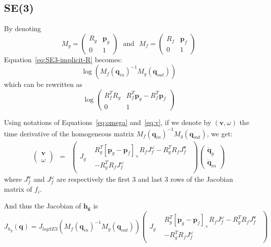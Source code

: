 \documentclass {article}
\newcommand\conf{\mathbf{q}}
\begin{document}
\subsection {SE(3)}

By denoting
$$
M_g=\left(\begin{array}{cc}R_g &\mathbf{p}_g\\
0 & 1 \end{array}\right)\ \ \  \mbox{and} \ \ \ M_{f}=\left(\begin{array}{cc}R_{f} &\mathbf{p}_{f}\\
0 & 1 \end{array}\right)
$$
Equation~\eqref{eq:SE3-implicit-R} becomes:
\begin{equation}\label{eq:g-SE3-implicit-R}
\log (M_{f}(\conf_{in})^{-1} M_g(\conf_{out}))
\end{equation}
which can be rewritten as
$$
\log \left(\begin{array}{cc}
R_{f}^T R_g & R_{f}^T\mathbf{p}_g - R_{f}^T\mathbf{p}_{f}\\
0 & 1
\end{array}\right)
$$

Using notations of Equations~\eqref{eq:omega} and~\eqref{eq:v},
if we denote by $(\mathbf{v}, \omega)$ the time derivative of the homogeneous matrix $M_{f}(\conf_{in})^{-1} M_g (\conf_{out})$, we get:
\begin{eqnarray*}
\left(\begin{array}{c}\mathbf{v}\\\omega\end{array}\right) &=&
\left(\begin{array}{cc}J_g & \begin{array}{c}R_g^T [\mathbf{p}_g - \mathbf{p}_{f}]_{\times} R_{f}J_{f}^{\omega} - R_g^T R_{f}J_{f}^{\mathbf{v}}\\
-R_g^TR_{f} J_{f}^{\omega}\end{array}\end{array}\right)
\left(\begin{array}{c}\dot{\conf}_g \\\dot{\conf}_{in}\end{array}\right)
\end{eqnarray*}
where $J_{f}^{\mathbf{v}}$ and $J_{f}^{\omega}$ are respectively the first 3 and last
3 rows of the Jacobian matrix of $f_i$.

And thus the Jacobian of $\mathbf{h_g}$ is
$$
J_{h_g} (\conf) = J_{logSE3} (M_{f}(\conf_{in})^{-1} M_g (\conf_{out}))
\left(\begin{array}{cc}J_g & \begin{array}{c}R_g^T [\mathbf{p}_g - \mathbf{p}_{f}]_{\times} R_{f}J_{f}^{\omega} - R_g^T R_{f}J_{f}^{\mathbf{v}}\\
-R_g^TR_{f} J_{f}^{\omega}\end{array}\end{array}\right)
$$
\end{document}
